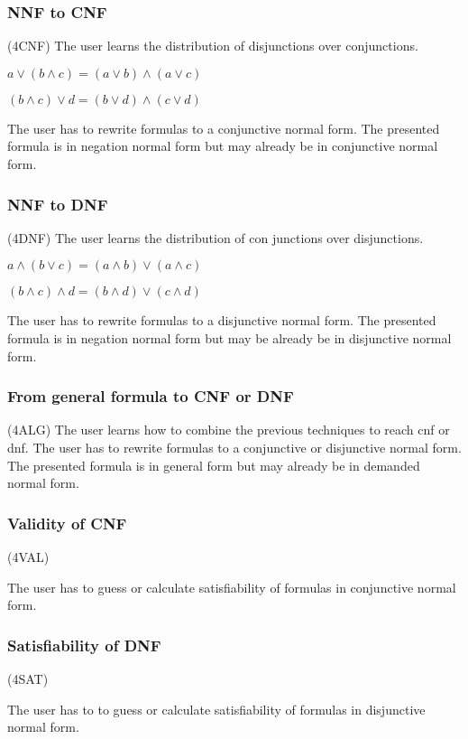 \subsubsection{NNF to CNF}
\label{tut:4CNF}
(4CNF)
The user learns the distribution of disjunctions over conjunctions.

$a \vee (b \wedge c) = (a\vee b) \wedge (a\vee c)$

$ (b \wedge c) \vee d = (b\vee d) \wedge (c\vee d)$

The user has to rewrite formulas to a conjunctive normal form.  
The presented formula is in negation normal form 
but may already be in conjunctive normal form.


\subsubsection{NNF to DNF}
\label{tut:4DNF}
(4DNF)
The user learns the distribution of con junctions over disjunctions.

$a \wedge (b \vee c) = (a\wedge b) \vee (a\wedge c)$

$ (b \wedge c) \wedge d = (b\wedge d) \vee (c\wedge d)$

The user has to rewrite formulas to a disjunctive normal form. 
The presented formula is in negation normal form 
but may be already be in disjunctive normal form.

\subsubsection{From general formula to CNF or DNF}
\label{tut:4ALG}
(4ALG)
The user learns how to combine the previous techniques to reach cnf or dnf.
The user has to rewrite formulas to a conjunctive or disjunctive normal form.
The presented formula is in general form
but may already be in demanded normal form.

\subsubsection{Validity of CNF}
\label{tut:4VAL}
(4VAL)

The user has to guess or calculate satisfiability of formulas in conjunctive normal form.

\subsubsection{Satisfiability of DNF} 
\label{tut:4SAT}
(4SAT)

The user has to to guess or calculate satisfiability of formulas in disjunctive normal form.

